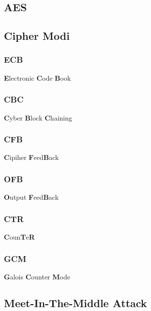 \documentclass[
  10pt,
  a4paper,
  twocolumn]{article}
\begin{document}
\subsection{AES}\label{aes}

\subsection{\texorpdfstring{Cipher Modi
\href{https://en.wikipedia.org/wiki/Block_cipher_mode_of_operation\#CTR}{\faWikipediaW}}{Cipher Modi }}\label{cipher-modi}

\subsubsection{ECB}\label{ecb}

\textbf{E}lectronic \textbf{C}ode \textbf{B}ook

\subsubsection{CBC}\label{cbc}

\textbf{C}yber \textbf{B}lock \textbf{C}haining

\subsubsection{CFB}\label{cfb}

\textbf{C}ipiher \textbf{F}eed\textbf{B}ack

\subsubsection{OFB}\label{ofb}

\textbf{O}utput \textbf{F}eed\textbf{B}ack

\subsubsection{CTR}\label{ctr}

\textbf{C}oun\textbf{T}e\textbf{R}

\subsubsection{GCM}\label{gcm}

\textbf{G}alois \textbf{C}ounter \textbf{M}ode

\subsection{Meet-In-The-Middle Attack}\label{meet-in-the-middle-attack}
\end{document}
